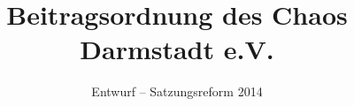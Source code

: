 \documentclass[ngerman]{article}
\begin{document}
\title{Beitragsordnung des Chaos Darmstadt e.V.}

\date{Entwurf -- Satzungsreform 2014}

\maketitle
\end{document}
